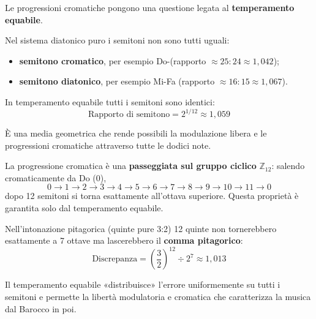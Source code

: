 \begin{matematica}
	\label{math:cromatismo_temperamento}
	Le progressioni cromatiche pongono una questione legata al \textbf{temperamento equabile}.

	Nel sistema diatonico puro i semitoni non sono tutti uguali:
	\begin{itemize}
		\item \textbf{semitono cromatico}, per esempio Do-\Dodiesis  (rapporto $\approx 25:24 \approx 1{,}042$);
		\item \textbf{semitono diatonico}, per esempio Mi-Fa (rapporto $\approx 16:15 \approx 1{,}067$).
	\end{itemize}

	In temperamento equabile tutti i semitoni sono identici:
	\[
	\text{Rapporto di semitono} = 2^{1/12} \approx 1{,}059
	\]

	È una media geometrica che rende possibili la modulazione libera e le progressioni cromatiche attraverso tutte le dodici note.

	La progressione cromatica è una \textbf{passeggiata sul gruppo ciclico} $\mathbb{Z}_{12}$: salendo cromaticamente da Do (0),
	\[
	0 \rightarrow 1 \rightarrow 2 \rightarrow 3 \rightarrow 4 \rightarrow 5 \rightarrow 6 \rightarrow 7 \rightarrow 8 \rightarrow 9 \rightarrow 10 \rightarrow 11 \rightarrow 0
	\]
	dopo 12 semitoni si torna esattamente all'ottava superiore. Questa proprietà è garantita solo dal temperamento equabile.

	Nell'intonazione pitagorica (quinte pure 3:2) 12 quinte non tornerebbero esattamente a 7 ottave ma lascerebbero il \textbf{comma pitagorico}:
	\[
	\text{Discrepanza} = \left(\frac{3}{2}\right)^{12} \div 2^7 \approx 1{,}013
	\]

	Il temperamento equabile «distribuisce» l'errore uniformemente su tutti i semitoni e permette la libertà modulatoria e cromatica che caratterizza la musica dal Barocco in poi.
\end{matematica}
